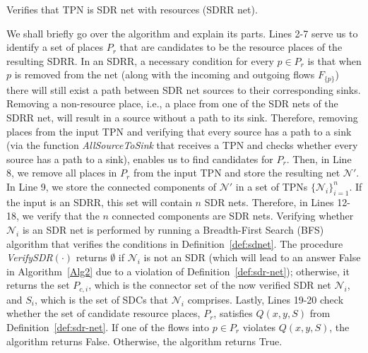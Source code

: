\begin{algorithm}[h!]
	
	\LinesNumbered
	\DontPrintSemicolon
	\SetAlgoLined


	\caption{Verifies that TPN is SDR net with resources (SDRR net).}
	\label{Alg2}
\end{algorithm}

We shall briefly go over the algorithm and 
explain its parts. Lines 2-7 serve us to identify 
a set of places $P_r$ that are candidates to be
the resource places of the resulting SDRR. 
In an SDRR,
a necessary condition for every $p \in P_r$ is 
that when $p$ is removed from the net (along
with the incoming and outgoing flows $F_{\{p\}}$) 
there will still exist a path between SDR net sources 
to their corresponding sinks. Removing a non-resource place,
i.e., a place from one of the SDR nets of the SDRR net, 
will result in a source without a path to its sink. 
Therefore, removing places from the input TPN
and verifying that every source has a path to a sink (via the
function \emph{AllSourceToSink} that receives a TPN and checks whether 
every source has a path to a sink),
enables us to find candidates for $P_r$. 
Then, in Line 8, we remove all places in $P_r$ from the input TPN
and store the resulting net $\mathcal{N}'$. In Line 9,
we store the connected components of $\mathcal{N}'$ in a set of
TPNs $\{\mathcal{N}_i\}_{i=1}^{n}$. If the input is an SDRR, 
this set will contain $n$ SDR nets. Therefore, in Lines 12-18,
we verify that the $n$ connected components are SDR nets. 
Verifying whether $\mathcal{N}_i$ is an SDR net 
is performed by running a 
Breadth-First Search (BFS) algorithm that 
verifies the conditions in Definition~\ref{def:sdnet}.
The procedure \emph{VerifySDR}$(\cdot)$ returns $\emptyset$
if $\mathcal{N}_i$ is not an SDR (which will lead to 
an answer False in Algorithm~\ref{Alg2} due to a violation of Definition~\ref{def:sdr-net});
otherwise,
it returns the set $P_{c,i}$, which is the connector set of the
now verified SDR net $\mathcal{N}_i$, and $S_i$,
which is the set of SDCs that $\mathcal{N}_i$ comprises.
Lastly, Lines 19-20 check whether the set of 
candidate resource places, $P_r$, satisfies $Q(x,y,S)$ 
from Definition~\ref{def:sdr-net}. If one of the flows
into $p \in P_r$ violates $Q(x,y,S)$, the algorithm returns False.
Otherwise, the algorithm returns True.


